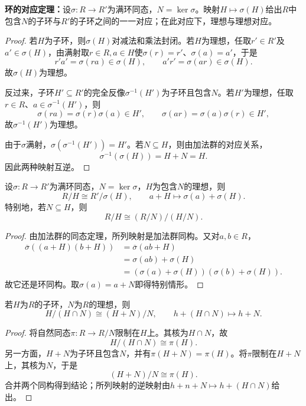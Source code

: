\begin{theorem}\label{p2:ring-correspondence}
\textbf{环的对应定理：}设$\sigma:R\to R'$为满环同态，$N=\ker\sigma$。映射$H\mapsto\sigma(H)$给出$R$中包含$N$的子环与$R'$的子环之间的一一对应；在此对应下，理想与理想对应。
\end{theorem}
\begin{proof}
若$H$为子环，则$\sigma(H)$对减法和乘法封闭。若$H$为理想，任取$r'\in R'$及$a'\in\sigma(H)$，由满射取$r\in R,a\in H$使$\sigma(r)=r'$、$\sigma(a)=a'$，于是
\[
r'a'=\sigma(ra)\in\sigma(H),\qquad a'r'=\sigma(ar)\in\sigma(H).
\]
故$\sigma(H)$为理想。

反过来，子环$H'\subseteq R'$的完全反像$\sigma^{-1}(H')$为子环且包含$N$。若$H'$为理想，任取$r\in R$、$a\in\sigma^{-1}(H')$，则
\[
\sigma(ra)=\sigma(r)\sigma(a)\in H',\qquad
\sigma(ar)=\sigma(a)\sigma(r)\in H',
\]
故$\sigma^{-1}(H')$为理想。

由于$\sigma$满射，$\sigma(\sigma^{-1}(H'))=H'$。若$N\subseteq H$，则由加法群的对应关系，
\[
\sigma^{-1}(\sigma(H))=H+N=H.
\]
因此两种映射互逆。
\end{proof}

\begin{theorem}\label{p2:ring-third-iso}
设$\sigma:R\to R'$为满环同态，$N=\ker\sigma$，$H$为包含$N$的理想，则
\[
R/H\cong R'/\sigma(H),\qquad
a+H\longmapsto\sigma(a)+\sigma(H).
\]
特别地，若$N\subseteq H$，则
\[
R/H\cong(R/N)/(H/N).
\]
\end{theorem}
\begin{proof}
由加法群的同态定理，所列映射是加法群同构。又对$a,b\in R$，
\begin{align*}
\overline\sigma((a+H)(b+H))
&=\overline\sigma(ab+H)\\
&=\sigma(ab)+\sigma(H)\\
&=(\sigma(a)+\sigma(H))(\sigma(b)+\sigma(H)).
\end{align*}
故它还是环同构。取$\sigma(a)=a+N$即得特别情形。
\end{proof}

\begin{theorem}\label{p2:ring-second-iso}
若$H$为$R$的子环，$N$为$R$的理想，则
\[
H/(H\cap N)\cong(H+N)/N,\qquad
h+(H\cap N)\longmapsto h+N.
\]
\end{theorem}
\begin{proof}
将自然同态$\pi:R\to R/N$限制在$H$上。其核为$H\cap N$，故
\[
H/(H\cap N)\cong\pi(H).
\]
另一方面，$H+N$为子环且包含$N$，并有$\pi(H+N)=\pi(H)$。将$\pi$限制在$H+N$上，其核为$N$，于是
\[
(H+N)/N\cong\pi(H).
\]
合并两个同构得到结论；所列映射的逆映射由$h+n+N\mapsto h+(H\cap N)$给出。
\end{proof}

